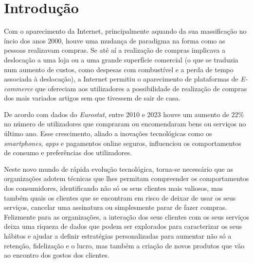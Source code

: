 \documentclass{easychair}
\begin{document}
\section{Introdução}
Com o aparecimento da Internet, principalmente aquando da sua massificação no íncio dos anos 2000, houve uma mudança de paradigma na forma como as pessoas realizavam compras. Se até aí a realização de compras implicava a deslocação a uma loja ou a uma grande superfície comercial (o que se traduzia num aumento de custos, como despesas com combustível e a perda de tempo associada à deslocação), a Internet permitiu o aparecimento de plataformas de \textit{E-commerce} que ofereciam aos utilizadores a possibilidade de realização de compras dos mais variados artigos sem que tivessem de sair de casa.

De acordo com dados do \textit{Eurostat}, entre 2010 e 2023 houve um aumento de 22\% no número de utilizadores que compraram ou encomendaram bens ou serviços no último ano\cite{eurostat}. Esse crescimento, aliado a inovações tecnológicas como os \textit{smartphones}, \textit{apps} e pagamentos online seguros, influenciou os comportamentos de consumo e preferências dos utilizadores.

Neste novo mundo de rápida evolução tecnológica, torna-se necessário que as organizações adotem técnicas que lhes permitam compreender os comportamentos dos consumidores, identificando não só os seus clientes mais valiosos, mas também quais os clientes que se encontram em risco de deixar de usar os seus serviços, cancelar uma assinatura ou simplesmente parar de fazer compras. Felizmente para as organizações, a interação dos seus clientes com os seus serviços deixa uma riqueza de dados que podem ser explorados para caracterizar os seus hábitos e ajudar a definir estratégias personalizadas para aumentar não só a retenção, fidelização e o lucro, mas também a criação de novos produtos que vão ao encontro dos gostos dos clientes.
\end{document}
